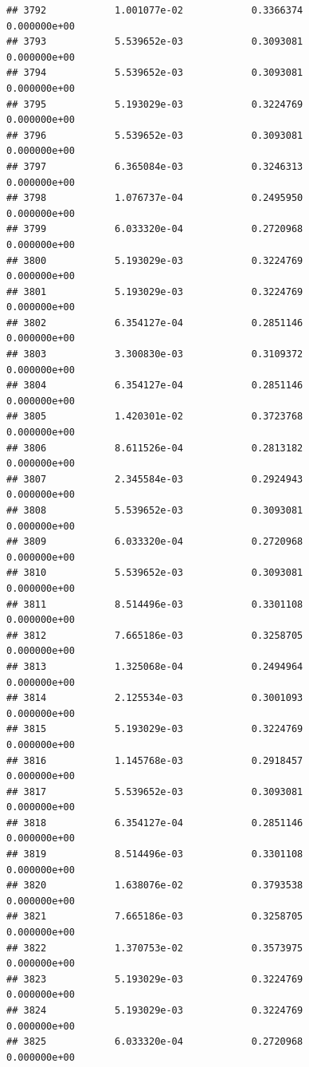 \documentclass[
]{article}
\begin{document}
\begin{verbatim}
## 3792            1.001077e-02            0.3366374            0.000000e+00
## 3793            5.539652e-03            0.3093081            0.000000e+00
## 3794            5.539652e-03            0.3093081            0.000000e+00
## 3795            5.193029e-03            0.3224769            0.000000e+00
## 3796            5.539652e-03            0.3093081            0.000000e+00
## 3797            6.365084e-03            0.3246313            0.000000e+00
## 3798            1.076737e-04            0.2495950            0.000000e+00
## 3799            6.033320e-04            0.2720968            0.000000e+00
## 3800            5.193029e-03            0.3224769            0.000000e+00
## 3801            5.193029e-03            0.3224769            0.000000e+00
## 3802            6.354127e-04            0.2851146            0.000000e+00
## 3803            3.300830e-03            0.3109372            0.000000e+00
## 3804            6.354127e-04            0.2851146            0.000000e+00
## 3805            1.420301e-02            0.3723768            0.000000e+00
## 3806            8.611526e-04            0.2813182            0.000000e+00
## 3807            2.345584e-03            0.2924943            0.000000e+00
## 3808            5.539652e-03            0.3093081            0.000000e+00
## 3809            6.033320e-04            0.2720968            0.000000e+00
## 3810            5.539652e-03            0.3093081            0.000000e+00
## 3811            8.514496e-03            0.3301108            0.000000e+00
## 3812            7.665186e-03            0.3258705            0.000000e+00
## 3813            1.325068e-04            0.2494964            0.000000e+00
## 3814            2.125534e-03            0.3001093            0.000000e+00
## 3815            5.193029e-03            0.3224769            0.000000e+00
## 3816            1.145768e-03            0.2918457            0.000000e+00
## 3817            5.539652e-03            0.3093081            0.000000e+00
## 3818            6.354127e-04            0.2851146            0.000000e+00
## 3819            8.514496e-03            0.3301108            0.000000e+00
## 3820            1.638076e-02            0.3793538            0.000000e+00
## 3821            7.665186e-03            0.3258705            0.000000e+00
## 3822            1.370753e-02            0.3573975            0.000000e+00
## 3823            5.193029e-03            0.3224769            0.000000e+00
## 3824            5.193029e-03            0.3224769            0.000000e+00
## 3825            6.033320e-04            0.2720968            0.000000e+00

\end{verbatim}
\end{document}

